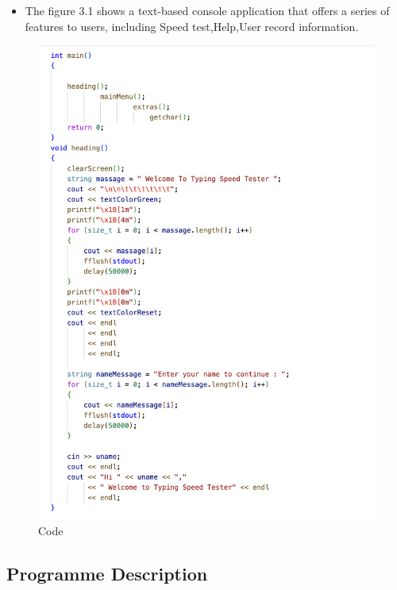 \begin{itemize}

        \item The figure 3.1 shows a text-based console application that offers a series of features to users, including  Speed test,Help,User record information.
\end{itemize}
\newpage
\begin{figure}[h]
     \includegraphics[scale=0.25]{CodeScreenShot/mainAndHeading.png}
    \caption{Code}
    \label{fig:code-screenshots}
\end{figure}

\subsection{Programme Description}

